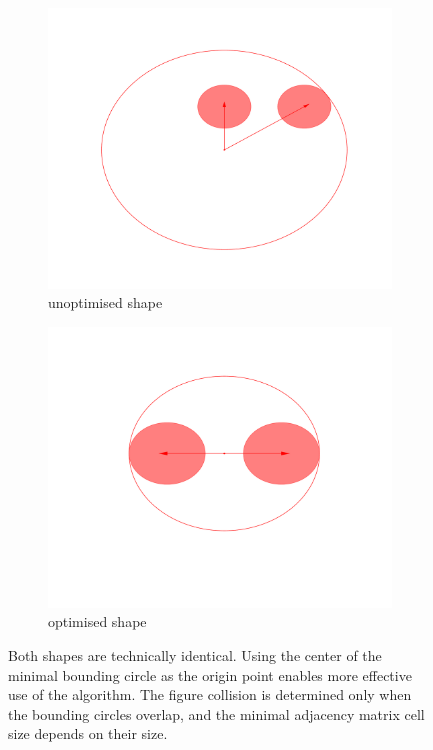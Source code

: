 \documentclass[12pt, oneside]{report}
\begin{document}
\begin{figure}
  \centering

  \begin{subfigure}[b]{0.4\linewidth}
    \includegraphics[width=\linewidth]{Images/Auxillaries/unoptimised_fig.pdf}
    \caption{unoptimised shape}
  \end{subfigure}
  \begin{subfigure}[b]{0.4\linewidth}
    \includegraphics[width=\linewidth]{Images/Auxillaries/optimised_fig.pdf}
    \caption{optimised shape}
  \end{subfigure}

\caption{Both shapes are technically identical. Using the center of the minimal bounding circle as the origin point enables more effective use of the algorithm. The figure collision is determined only when the bounding circles overlap, and the minimal adjacency matrix cell size depends on their size.}
\end{figure}
\end{document}
